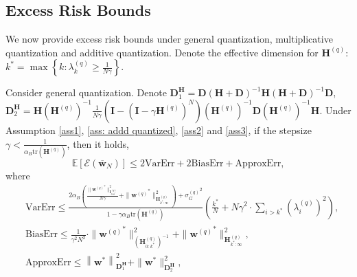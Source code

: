 \documentclass[11pt, letterpaper]{article}
\begin{document}
\subsection{Excess Risk Bounds}
\label{Excess Risk Bounds}
We now provide excess risk bounds under general quantization, multiplicative quantization and additive quantization. Denote the effective dimension for $\mathbf{H}^{(q)}$: $k^*=\max\left\{k: \lambda_k^{(q)} \geq \frac{1}{N\gamma}\right\}$.
\begin{theorem}
    \label{Theorem 4}
    Consider general quantization. Denote $\mathbf{D}_1^{\mathbf{H}}=\mathbf{D}(\mathbf{H}+\mathbf{D})^{-1}\mathbf{H}(\mathbf{H}+\mathbf{D})^{-1}\mathbf{D}$, $\mathbf{D}_2^{\mathbf{H}}=\mathbf{H}(\mathbf{H}^{(q)})^{-1}\frac{1}{N\gamma}\left(\mathbf{I}-(\mathbf{I}-\gamma\mathbf{H}^{(q)})^N\right)(\mathbf{H}^{(q)})^{-1}\mathbf{D}(\mathbf{H}^{(q)})^{-1}\mathbf{H}$. Under Assumption \ref{ass1}, \ref{ass: addd quantized}, \ref{ass2} and \ref{ass3}, if the stepsize $\gamma < \frac{1}{\alpha_B \mathrm{tr}(\mathbf{H}^{(q)})}$, then it holds,
    \begin{equation*}
        \mathbb{E}[\mathcal E(\overline{\mathbf{w}}_N)]\leq 2\mathrm{VarErr}+2\mathrm{BiasErr}+\mathrm{ApproxErr},
    \end{equation*}
    where
    \begin{equation*}
        \begin{aligned}
            &\mathrm{VarErr}\leq\frac{2\alpha_B\left(\frac{\|{\mathbf{w}^{(q)}}^*\|_{\mathbf{I}_{0:k^*}^{(q)}}^2}{N\gamma}+\|{\mathbf{w}^{(q)}}^*\|_{\mathbf{H}_{k^*:\infty}^{(q)}}^2\right)+{\sigma_G^{(q)}}^2}{1-\gamma\alpha_B\mathrm{tr}(\mathbf{H}^{(q)})}\left(\frac{k^*}{N}+N\gamma^2\cdot\sum_{i>k^*}(\lambda_i^{(q)})^2\right),\\
            &\mathrm{BiasErr}\leq\frac{1}{\gamma^2N^2}\cdot\|{\mathbf{w}^{(q)}}^*\|_{(\mathbf{H}_{0:k^*}^{(q)})^{-1}}^2+\|{\mathbf{w}^{(q)}}^*\|_{\mathbf{H}_{k^*:\infty}^{(q)}}^2,\\
            &\mathrm{ApproxErr}\leq\left\|\mathbf{w}^*\right\|_{\mathbf{D}_1^{\mathbf{H}}}^2+\|\mathbf{w}^*\|_{\mathbf{D}_2^\mathbf{H}}^2,

\end{aligned}
\end{equation*}
\end{theorem}
\end{document}
